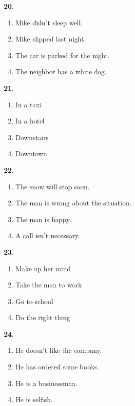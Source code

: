 \documentclass[12pt]{article}
\begin{document}
\noindent\textbf{20.}
\begin{enumerate}[label=(\Alph*),leftmargin=*,itemsep=0.2em]
\item Mike didn't sleep well.
\item Mike slipped last night.
\item The car is parked for the night.
\item The neighbor has a white dog.
\end{enumerate}
\par
\vspace{0.25\baselineskip}
\noindent\textbf{21.}
\begin{enumerate}[label=(\Alph*),leftmargin=*,itemsep=0.2em]
\item In a taxi
\item In a hotel
\item Downstairs
\item Downtown
\end{enumerate}
\par
\vspace{0.25\baselineskip}
\noindent\textbf{22.}
\begin{enumerate}[label=(\Alph*),leftmargin=*,itemsep=0.2em]
\item The snow will stop soon.
\item The man is wrong about the situation.
\item The man is happy.
\item A call isn't necessary.
\end{enumerate}
\par
\vspace{0.25\baselineskip}
\noindent\textbf{23.}
\begin{enumerate}[label=(\Alph*),leftmargin=*,itemsep=0.2em]
\item Make up her mind
\item Take the man to work
\item Go to school
\item Do the right thing
\end{enumerate}
\par
\vspace{0.25\baselineskip}
\noindent\textbf{24.}
\begin{enumerate}[label=(\Alph*),leftmargin=*,itemsep=0.2em]
\item He doesn't like the company.
\item He has ordered some books.
\item He is a businessman.
\item He is selfish.
\end{enumerate}
\end{document}
